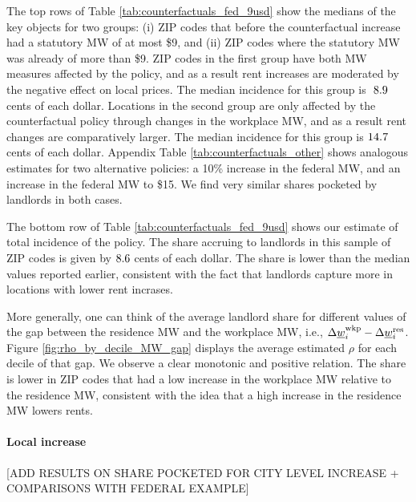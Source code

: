 The top rows of Table \ref{tab:counterfactuals_fed_9usd} show the medians of 
the key objects for two groups: 
(i) ZIP codes that before the counterfactual increase had a statutory MW of 
at most \$9, and 
(ii) ZIP codes where the statutory MW was already of more than \$9.
ZIP codes in the first group have both MW measures affected by the policy,
and as a result rent increases are moderated by the negative effect on local
prices.
The median incidence for this group is $\textnormal{ 8.9}$ cents of each 
dollar.
Locations in the second group are only affected by the counterfactual policy 
through changes in the workplace MW, and as a result rent changes are 
comparatively larger.
The median incidence for this group is $\textnormal{14.7}$ cents of each 
dollar.
Appendix Table \ref{tab:counterfactuals_other} shows analogous estimates for
two alternative policies: a 10\% increase in the federal MW, and an increase
in the federal MW to \$15.
We find very similar shares pocketed by landlords in both cases.

The bottom row of Table \ref{tab:counterfactuals_fed_9usd} shows our estimate
of total incidence of the policy.
The share accruing to landlords in this sample of ZIP codes is given by 
$\textnormal{8.6}$ cents of each dollar.
The share is lower than the median values reported earlier, consistent with
the fact that landlords capture more in locations with lower rent incrases.

More generally, one can think of the average landlord share for different 
values of the gap between the residence MW and the workplace MW, 
i.e., $\Delta \underline{w}_i^{\text{wkp}} - \Delta \underline{w}_i^{\text{res}}$.
Figure \ref{fig:rho_by_decile_MW_gap} displays the average estimated $\rho$ for 
each decile of that gap.
We observe a clear monotonic and positive relation.
The share is lower in ZIP codes that had a low increase in the workplace MW 
relative to the residence MW, consistent with the idea that a high increase 
in the residence MW lowers rents.

\paragraph{Local increase}
[ADD RESULTS ON SHARE POCKETED FOR CITY LEVEL INCREASE + COMPARISONS
WITH FEDERAL EXAMPLE]